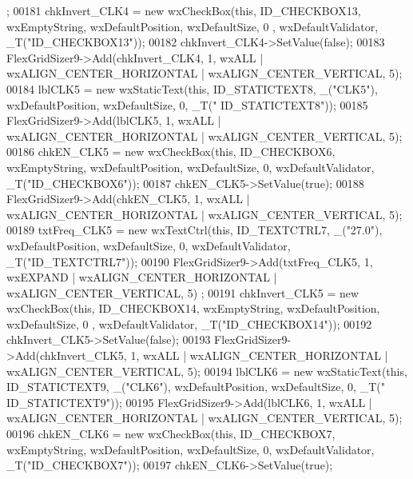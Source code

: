 \begin{DoxyCode}
      ;
00181     chkInvert\_CLK4 = \textcolor{keyword}{new} wxCheckBox(\textcolor{keyword}{this}, ID\_CHECKBOX13, wxEmptyString, wxDefaultPosition, wxDefaultSize, 0
      , wxDefaultValidator, \_T(\textcolor{stringliteral}{"ID\_CHECKBOX13"}));
00182     chkInvert\_CLK4->SetValue(\textcolor{keyword}{false});
00183     FlexGridSizer9->Add(chkInvert\_CLK4, 1, wxALL | wxALIGN\_CENTER\_HORIZONTAL | wxALIGN\_CENTER\_VERTICAL, 5);
00184     lblCLK5 = \textcolor{keyword}{new} wxStaticText(\textcolor{keyword}{this}, ID\_STATICTEXT8, \_(\textcolor{stringliteral}{"CLK5"}), wxDefaultPosition, wxDefaultSize, 0, \_T(\textcolor{stringliteral}{"
      ID\_STATICTEXT8"}));
00185     FlexGridSizer9->Add(lblCLK5, 1, wxALL | wxALIGN\_CENTER\_HORIZONTAL | wxALIGN\_CENTER\_VERTICAL, 5);
00186     chkEN\_CLK5 = \textcolor{keyword}{new} wxCheckBox(\textcolor{keyword}{this}, ID\_CHECKBOX6, wxEmptyString, wxDefaultPosition, wxDefaultSize, 0, 
      wxDefaultValidator, \_T(\textcolor{stringliteral}{"ID\_CHECKBOX6"}));
00187     chkEN\_CLK5->SetValue(\textcolor{keyword}{true});
00188     FlexGridSizer9->Add(chkEN\_CLK5, 1, wxALL | wxALIGN\_CENTER\_HORIZONTAL | wxALIGN\_CENTER\_VERTICAL, 5);
00189     txtFreq\_CLK5 = \textcolor{keyword}{new} wxTextCtrl(\textcolor{keyword}{this}, ID\_TEXTCTRL7, \_(\textcolor{stringliteral}{"27.0"}), wxDefaultPosition, wxDefaultSize, 0, 
      wxDefaultValidator, \_T(\textcolor{stringliteral}{"ID\_TEXTCTRL7"}));
00190     FlexGridSizer9->Add(txtFreq\_CLK5, 1, wxEXPAND | wxALIGN\_CENTER\_HORIZONTAL | wxALIGN\_CENTER\_VERTICAL, 5)
      ;
00191     chkInvert\_CLK5 = \textcolor{keyword}{new} wxCheckBox(\textcolor{keyword}{this}, ID\_CHECKBOX14, wxEmptyString, wxDefaultPosition, wxDefaultSize, 0
      , wxDefaultValidator, \_T(\textcolor{stringliteral}{"ID\_CHECKBOX14"}));
00192     chkInvert\_CLK5->SetValue(\textcolor{keyword}{false});
00193     FlexGridSizer9->Add(chkInvert\_CLK5, 1, wxALL | wxALIGN\_CENTER\_HORIZONTAL | wxALIGN\_CENTER\_VERTICAL, 5);
00194     lblCLK6 = \textcolor{keyword}{new} wxStaticText(\textcolor{keyword}{this}, ID\_STATICTEXT9, \_(\textcolor{stringliteral}{"CLK6"}), wxDefaultPosition, wxDefaultSize, 0, \_T(\textcolor{stringliteral}{"
      ID\_STATICTEXT9"}));
00195     FlexGridSizer9->Add(lblCLK6, 1, wxALL | wxALIGN\_CENTER\_HORIZONTAL | wxALIGN\_CENTER\_VERTICAL, 5);
00196     chkEN\_CLK6 = \textcolor{keyword}{new} wxCheckBox(\textcolor{keyword}{this}, ID\_CHECKBOX7, wxEmptyString, wxDefaultPosition, wxDefaultSize, 0, 
      wxDefaultValidator, \_T(\textcolor{stringliteral}{"ID\_CHECKBOX7"}));
00197     chkEN\_CLK6->SetValue(\textcolor{keyword}{true});

\end{DoxyCode}
